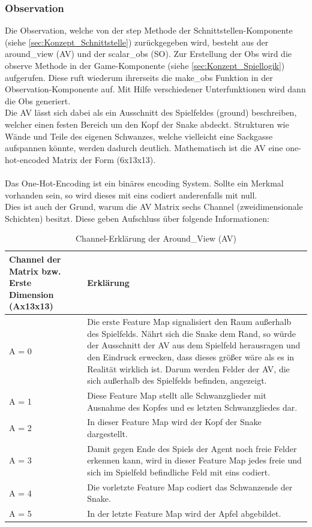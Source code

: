 \subsubsection{Observation} \label{sec:Konzept_Observation}
Die Observation, welche von der step Methode der Schnittstellen-Komponente (siehe \ref{sec:Konzept_Schnittstelle}) zurückgegeben wird, besteht aus der around\_view (AV) und der scalar\_obs (SO). Zur Erstellung der Obs wird die observe Methode in der Game-Komponente (siehe \ref{sec:Konzept_Spiellogik}) aufgerufen. Diese ruft wiederum ihrerseits die make\_obs Funktion in der Observation-Komponente auf. Mit Hilfe verschiedener Unterfunktionen wird dann die Obs generiert.\\
Die AV lässt sich dabei als ein Ausschnitt des Spielfeldes (ground) beschreiben, welcher einen festen Bereich um den Kopf der Snake abdeckt.
Strukturen wie Wände und Teile des eigenen Schwanzes, welche vielleicht eine Sackgasse aufspannen könnte, werden dadurch deutlich. Mathematisch ist die AV eine one-hot-encoded Matrix der Form (6x13x13).\\
\\Das One-Hot-Encoding ist ein binäres encoding System. Sollte ein Merkmal vorhanden sein, so wird dieses mit eins codiert anderenfalls mit null. \cite[S. 359 f.]{DRL_Lapan}\\
Dies ist auch der Grund, warum die AV Matrix sechs Channel (zweidimensionale Schichten) besitzt. Diese geben Aufschluss über folgende Informationen:
\begin{longtable}[h]{|p{4cm}|p{\linewidth - 5cm}|}
	\caption{Channel-Erklärung der Around\_View (AV)}
	\label{tab:around_view} 
	\endfirsthead
	\endhead
	\hline
	Channel der Matrix bzw. Erste Dimension (Ax13x13) & Erklärung \\
	\hline
	A = 0 & Die erste Feature Map signalisiert den Raum außerhalb des Spielfelds. Nährt sich die Snake dem Rand, so würde der Ausschnitt der AV aus dem Spielfeld herausragen und den Eindruck erwecken, dass dieses größer wäre als es in Realität wirklich ist. Darum werden Felder der AV, die sich außerhalb des Spielfelds befinden, angezeigt.\\
	\hline
	A = 1 & Diese Feature Map stellt alle Schwanzglieder mit Ausnahme des Kopfes und es letzten Schwanzgliedes dar. \\
	\hline
	A = 2 & In dieser Feature Map wird der Kopf der Snake dargestellt. \\
	\hline
	A = 3 & Damit gegen Ende des Spiels der Agent noch freie Felder erkennen kann, wird in dieser Feature Map jedes freie und sich im Spielfeld befindliche Feld mit eins codiert. \\
	\hline
	A = 4 & Die vorletzte Feature Map codiert das Schwanzende der Snake. \\
	\hline
	A = 5 & In der letzte Feature Map wird der Apfel abgebildet. \\
	\hline
\end{longtable}

